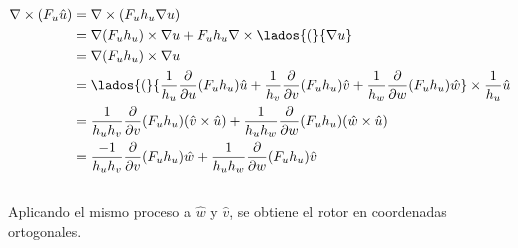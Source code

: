 \begin{equation}
\begin{split}
    \nabla\times(F_u\hat{u})&=\nabla\times(F_uh_u\nabla u)\\
    &=\nabla(F_uh_u)\times\nabla u+F_uh_u\nabla\times
    \lados{(}{\nabla u}\\
    &=\nabla(F_uh_u)\times\nabla u\\
    &=\lados{(}{\frac{1}{h_u}\frac{\partial}{\partial u}
    (F_uh_u)\hat{u}+\frac{1}{h_v}\frac{\partial}{\partial v}(F_uh_u)\hat{v}+\frac{1}{h_w}\frac{\partial}{\partial w}(F_uh_u)\hat{w}}\times\frac{1}{h_u}\hat{u}\\
    &=\frac{1}{h_uh_v}\frac{\partial}{\partial v}(F_uh_u)(\hat{v}\times\hat{u})+\frac{1}{h_uh_w}\frac{\partial}{\partial w}(F_uh_u)(\hat{w}\times\hat{u})\\
    &=\frac{-1}{h_uh_v}\frac{\partial}{\partial v}(F_uh_u)\hat{w}+\frac{1}{h_uh_w}\frac{\partial}{\partial w}(F_uh_u)\hat{v}\\
\end{split}
\nonumber
\end{equation}
\\
Aplicando el mismo proceso a $\hat{w}$ y $\hat{v}$, se obtiene el rotor en coordenadas ortogonales.

\newpage